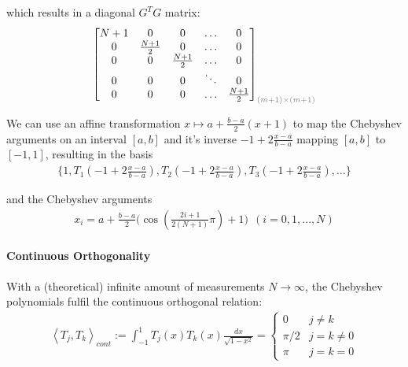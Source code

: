 which results in a diagonal $G^TG$ matrix:
\begin{align*}
    \begin{bmatrix}
        N+1 & 0             & 0             & \ldots & 0             \\
        0   & \frac{N+1}{2} & 0             & \ldots & 0             \\
        0   & 0             & \frac{N+1}{2} & \ldots & 0             \\
        0   & 0             & 0             & \ddots & 0             \\
        0   & 0             & 0             & \ldots & \frac{N+1}{2}
    \end{bmatrix}_{\color{gray}(m+1)\times(m+1)}
\end{align*}

We can use an affine transformation $x\mapsto a + \frac{b-a}{2}(x+1)$ to map the
Chebyshev arguments on an interval $[a,b]$ and it's inverse
$-1+2\frac{x-a}{b-a}$ mapping $[a,b]$ to $[-1, 1]$, resulting in the basis
\begin{align*}
    \{1,T_{1}(-1+2\frac{x-a}{b-a}),T_{2}(-1+2\frac{x-a}{b-a}),T_{3}(-1+2\frac{x-a}{b-a}),\ldots\}
\end{align*}

and the Chebyshev arguments
\begin{align*}
    x_{i}=a+\frac{b-a}{2}\Biggl(\cos\left(\frac{2i+1}{2(N+1)}\pi\right)+1\Biggr)\ \ (i=0,1,...,N)
\end{align*}

\paragraph{Continuous Orthogonality}

With a (theoretical) infinite amount of measurements $N\to\infty$,
the Chebyshev polynomials fulfil the continuous orthogonal relation:
\begin{align*}
    \left\langle T_{j},T_{k}\right\rangle_{cont}
    := \int_{-1}^{1} T_{j}(x)T_{k}(x)\frac{d x}{\sqrt{1-x^{2}}} =
    \left\{
    \begin{matrix}
        0       & j \neq k     \\
        \pi / 2 & j = k \neq 0 \\
        \pi     & j = k = 0
    \end{matrix}
    \right.
\end{align*}

